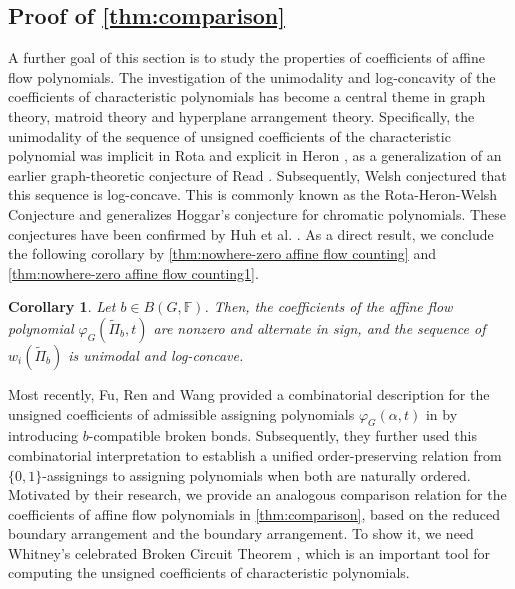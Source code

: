 \documentclass[12pt]{article}%
\renewcommand*{\bm}[1]{#1}%
\numberwithin{equation}{section}
\newtheorem{corollary}[corollary]{Corollary}
\begin{document}
\subsection{Proof of \autoref{thm:comparison}}\label{Sec4-2}
A further goal of this section is to study the properties of coefficients of affine flow polynomials. The investigation of the unimodality and log-concavity of the coefficients of  characteristic polynomials has become a central theme in graph theory, matroid theory and hyperplane arrangement theory. Specifically, the unimodality of the sequence of unsigned coefficients of the characteristic polynomial was implicit in Rota \cite{Rota1971} and explicit in Heron \cite{Heron1972}, as a generalization of an earlier graph-theoretic conjecture of Read \cite{Read1968}. Subsequently, Welsh \cite{Welsh1976} conjectured that this sequence is log-concave. This is commonly known as the Rota-Heron-Welsh Conjecture and generalizes Hoggar's conjecture \cite{Hoggar1974} for chromatic polynomials. These conjectures have been confirmed by Huh et al. \cite{AHE2018,Huh2012,Huh-Katz2012}. As a direct result, we conclude the following corollary by \autoref{thm:nowhere-zero affine flow counting} and \autoref{thm:nowhere-zero affine flow counting1}.
\begin{corollary}
Let $\bm b\in B(G,\mathbb{F})$. Then,  the coefficients of the affine flow polynomial $\varphi_G(\tilde{\Pi}_{\bm b},t)$  are nonzero and alternate in sign, and the sequence of $w_i(\tilde{\Pi}_{\bm b})$ is unimodal and log-concave.
\end{corollary}

Most recently, Fu, Ren and Wang provided a combinatorial description for the unsigned coefficients of admissible assigning polynomials $\varphi_G(\alpha,t)$ in \cite[Theorem 1.5]{FRW2025} by introducing $\bm b$-compatible broken bonds. Subsequently, they further used this combinatorial interpretation to establish a unified order-preserving relation from $\{0,1\}$-assignings to assigning polynomials when both are naturally ordered. Motivated by their research, we provide an analogous comparison relation for the coefficients of affine flow polynomials in \autoref{thm:comparison}, based on the reduced boundary arrangement and the boundary arrangement. To show it, we need Whitney's celebrated Broken Circuit Theorem \cite{Whitney1932}, which is an important tool for computing the unsigned coefficients of characteristic polynomials. 
\end{document}
